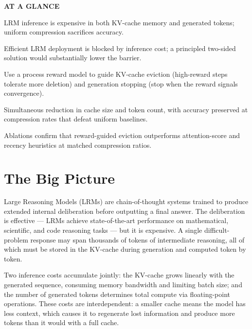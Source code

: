 \documentclass[10pt,twocolumn]{article}
\begin{document}
\begin{mdframed}[backgroundcolor=boxgray,linecolor=rulered,linewidth=1pt,
    innerleftmargin=6pt,innerrightmargin=6pt,
    innertopmargin=6pt,innerbottommargin=6pt]
\textbf{\small AT A GLANCE}\par\vspace{4pt}
\begin{description}[leftmargin=0pt,labelsep=4pt,itemsep=2pt,parsep=0pt,
    font=\small\bfseries]
  \item[Problem:] LRM inference is expensive in both KV-cache memory and
    generated tokens; uniform compression sacrifices accuracy.
  \item[Why it matters:] Efficient LRM deployment is blocked by inference cost;
    a principled two-sided solution would substantially lower the barrier.
  \item[Method:] Use a process reward model to guide KV-cache eviction
    (high-reward steps tolerate more deletion) and generation stopping
    (stop when the reward signals convergence).
  \item[Result:] Simultaneous reduction in cache size and token count,
    with accuracy preserved at compression rates that defeat uniform baselines.
  \item[Evidence:] Ablations confirm that reward-guided eviction outperforms
    attention-score and recency heuristics at matched compression ratios.
\end{description}
\end{mdframed}

\section{The Big Picture}

Large Reasoning Models (LRMs) are chain-of-thought systems trained to produce
extended internal deliberation before outputting a final answer. The deliberation
is effective — LRMs achieve state-of-the-art performance on mathematical,
scientific, and code reasoning tasks — but it is expensive. A single
difficult-problem response may span thousands of tokens of intermediate reasoning,
all of which must be stored in the KV-cache during generation and computed token
by token.

Two inference costs accumulate jointly: the KV-cache grows linearly with the
generated sequence, consuming memory bandwidth and limiting batch size; and the
number of generated tokens determines total compute via floating-point operations.
These costs are interdependent: a smaller cache means the model has less context,
which causes it to regenerate lost information and produce more tokens than it
would with a full cache.
\end{document}
